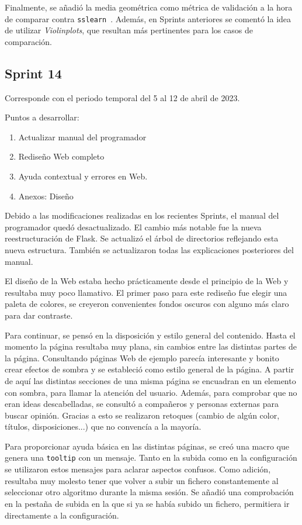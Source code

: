 Finalmente, se añadió la media geométrica como métrica de validación a la hora
de comparar contra
\texttt{sslearn}~\cite{jose_luis_garrido_labrador_2023_7781117}. Además, en
Sprints anteriores se comentó la idea de utilizar \textit{Violinplots}, que
resultan más pertinentes para los casos de comparación.

\subsection{Sprint 14}
Corresponde con el periodo temporal del 5 al 12 de abril de 2023.

Puntos a desarrollar:
\begin{enumerate}
    \item Actualizar manual del programador
    \item Rediseño Web completo
    \item Ayuda contextual y errores en Web.
    \item Anexos: Diseño
\end{enumerate}

Debido a las modificaciones realizadas en los recientes Sprints, el manual del
programador quedó desactualizado. El cambio más notable fue la nueva
reestructuración de Flask. Se actualizó el árbol de directorios reflejando esta
nueva estructura. También se actualizaron todas las explicaciones posteriores
del manual.

El diseño de la Web estaba hecho prácticamente desde el principio de la Web y
resultaba muy poco llamativo. El primer paso para este rediseño fue elegir una
paleta de colores, se creyeron convenientes fondos oscuros con alguno más claro
para dar contraste.

Para continuar, se pensó en la disposición y estilo general del contenido. Hasta
el momento la página resultaba muy plana, sin cambios entre las distintas partes
de la página. Consultando páginas Web de ejemplo parecía interesante y bonito
crear efectos de sombra y se estableció como estilo general de la página. A
partir de aquí las distintas secciones de una misma página se encuadran en un
elemento con sombra, para llamar la atención del usuario. Además, para comprobar
que no eran ideas descabelladas, se consultó a compañeros y personas externas
para buscar opinión. Gracias a esto se realizaron retoques (cambio de algún
color, títulos, disposiciones...) que no convencía a la mayoría.


Para proporcionar ayuda básica en las distintas páginas, se creó una macro que
genera una \texttt{tooltip} con un mensaje. Tanto en la subida como en la
configuración se utilizaron estos mensajes para aclarar aspectos confusos. Como
adición, resultaba muy molesto tener que volver a subir un fichero
constantemente al seleccionar otro algoritmo durante la misma sesión. Se añadió
una comprobación en la pestaña de subida en la que si ya se había subido un
fichero, permitiera ir directamente a la configuración.

